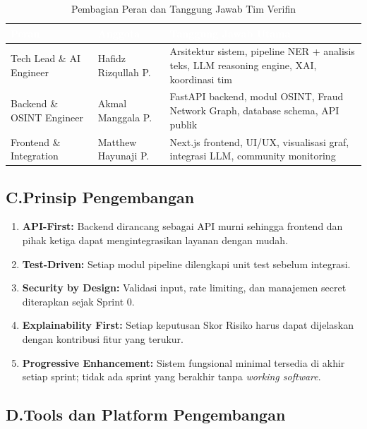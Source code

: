 \documentclass[12pt,a4paper]{article}
\newcommand{\thead}[1]{\textcolor{white}{\textbf{#1}}}
\begin{document}
\begin{adjustwidth}{0.50cm}{0pt}
\begin{table}[H]
\centering
\caption{Pembagian Peran dan Tanggung Jawab Tim Verifin}
\label{tab:team-roles}
\small
\begin{tabularx}{\linewidth}{@{}p{3.8cm}p{3.2cm}Y@{}}
\toprule
{}\thead{Peran} & \thead{Anggota} & \thead{Tanggung Jawab Utama} \\
\midrule
{}
Tech Lead \& AI Engineer & Hafidz Rizqullah P. & Arsitektur sistem, pipeline NER + analisis teks, LLM reasoning engine, XAI, koordinasi tim \\
Backend \& OSINT Engineer & Akmal Manggala P. & FastAPI backend, modul OSINT, Fraud Network Graph, database schema, API publik \\
Frontend \& Integration & Matthew Hayunaji P. & Next.js frontend, UI/UX, visualisasi graf, integrasi LLM, community monitoring \\
\bottomrule
\end{tabularx}
\end{table}
\end{adjustwidth}

\subsection*{C.\quad Prinsip Pengembangan}

\begin{enumerate}[label=\textbf{\arabic*.}]
\item \textbf{API-First:} Backend dirancang sebagai API murni sehingga frontend dan pihak ketiga
      dapat mengintegrasikan layanan dengan mudah.
\item \textbf{Test-Driven:} Setiap modul pipeline dilengkapi unit test sebelum integrasi.
\item \textbf{Security by Design:} Validasi input, rate limiting, dan manajemen secret diterapkan
      sejak Sprint 0.
\item \textbf{Explainability First:} Setiap keputusan Skor Risiko harus dapat dijelaskan dengan
      kontribusi fitur yang terukur.
\item \textbf{Progressive Enhancement:} Sistem fungsional minimal tersedia di akhir setiap sprint;
      tidak ada sprint yang berakhir tanpa \textit{working software}.
\end{enumerate}

\subsection*{D.\quad Tools dan Platform Pengembangan}
\end{document}
